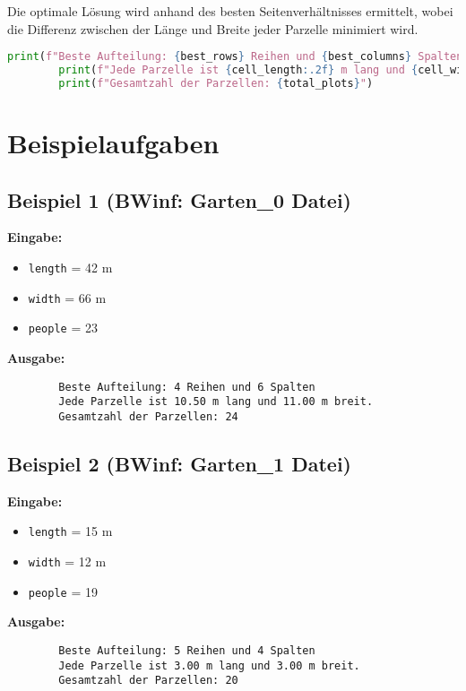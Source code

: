 \documentclass[a4paper,10pt,ngerman]{scrartcl}
\begin{document}
	Die optimale Lösung wird anhand des besten Seitenverhältnisses ermittelt, wobei die Differenz zwischen der Länge und Breite jeder Parzelle minimiert wird.
	\begin{lstlisting}[language=Python, caption=Ausgabe der Ergebnisse]
	    print(f"Beste Aufteilung: {best_rows} Reihen und {best_columns} Spalten")
		print(f"Jede Parzelle ist {cell_length:.2f} m lang und {cell_width:.2f} m breit.")
		print(f"Gesamtzahl der Parzellen: {total_plots}")

	\end{lstlisting}
	
	
	\section{Beispielaufgaben}
	
	\subsection{Beispiel 1 (BWinf: Garten\_0 Datei)}
	\textbf{Eingabe:}
	\begin{itemize}
		\item \texttt{length} = 42 m
		\item \texttt{width} = 66 m
		\item \texttt{people} = 23
	\end{itemize}
	
	\textbf{Ausgabe:}
	\begin{verbatim}
		Beste Aufteilung: 4 Reihen und 6 Spalten
		Jede Parzelle ist 10.50 m lang und 11.00 m breit.
		Gesamtzahl der Parzellen: 24
	\end{verbatim}
	
	\subsection{Beispiel 2 (BWinf: Garten\_1 Datei)}
	\textbf{Eingabe:}
	\begin{itemize}
		\item \texttt{length} = 15 m
		\item \texttt{width} = 12 m
		\item \texttt{people} = 19
	\end{itemize}
	
	\textbf{Ausgabe:}
	\begin{verbatim}
		Beste Aufteilung: 5 Reihen und 4 Spalten
		Jede Parzelle ist 3.00 m lang und 3.00 m breit.
		Gesamtzahl der Parzellen: 20
	\end{verbatim}
	
\end{document}
